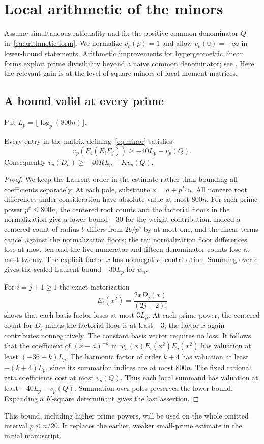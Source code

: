 \section{Local arithmetic of the minors}\label{sec:local}
Assume simultaneous rationality and fix the positive common denominator
$Q$ in~\eqref{eq:arithmetic-form}. We normalize $v_p(p)=1$ and allow
$v_p(0)=+\infty$ in lower-bound statements. Arithmetic improvements for
hypergeometric linear forms exploit prime divisibility beyond a naive common
denominator; see \cite{Zudilin04,Viola03}. Here the relevant gain is at the
level of square minors of local moment matrices.

\subsection{A bound valid at every prime}
Put $L_p=\lfloor\log_p(800n)\rfloor$.
\begin{lemma}\label{lem:small-primes}
Every entry in the matrix defining~\eqref{eq:minor} satisfies
\begin{equation}\label{eq:small-entry}
 v_p(F_4(E_iE_j))\ge-40L_p-v_p(Q).
\end{equation}
Consequently $v_p(D_n)\ge-40KL_p-Kv_p(Q)$.
\end{lemma}
\begin{proof}
We keep the Laurent order in the estimate rather than bounding all
coefficients separately. At each pole, substitute $x=a+p^{L_p}u$.
All nonzero root differences under consideration have absolute value at
most $800n$. For each prime power $p^e\le800n$, the centered root counts
and the factorial floors in the normalization give a lower bound $-30$
for the weight contribution. Indeed a centered count of radius $b$ differs
from $2b/p^e$ by at most one, and the linear terms cancel against the
normalization floors; the ten normalization floor differences lose at most
ten and the five numerator and fifteen denominator counts lose at most
twenty. The explicit factor $x$ has nonnegative contribution. Summing over
$e$ gives the scaled Laurent bound $-30L_p$ for $w_n$.

For $i=j+1\ge1$ the exact factorization
\[
 E_i(x^2)=\frac{2xD_j(x)}{(2j+2)!}
\]
shows that each basis factor loses at most $3L_p$. At each prime power,
the centered count for $D_j$ minus the factorial floor is at least $-3$;
the factor $x$ again contributes nonnegatively. The constant basis vector
requires no loss. It follows that the coefficient of $(x-a)^{-k}$ in
$w_n(x)E_i(x^2)E_j(x^2)$ has valuation at least $(-36+k)L_p$.
The harmonic factor of order $k+4$ has valuation at least
$-(k+4)L_p$, since its summation indices are at most $800n$.
The fixed rational zeta coefficients cost at most $v_p(Q)$.
Thus each local summand has valuation at least $-40L_p-v_p(Q)$.
Summation over poles preserves the lower bound. Expanding a $K$-square
determinant gives the last assertion.
\end{proof}
This bound, including higher prime powers, will be used on the whole
omitted interval $p\le n/20$. It replaces the earlier, weaker small-prime
estimate in the initial manuscript.

